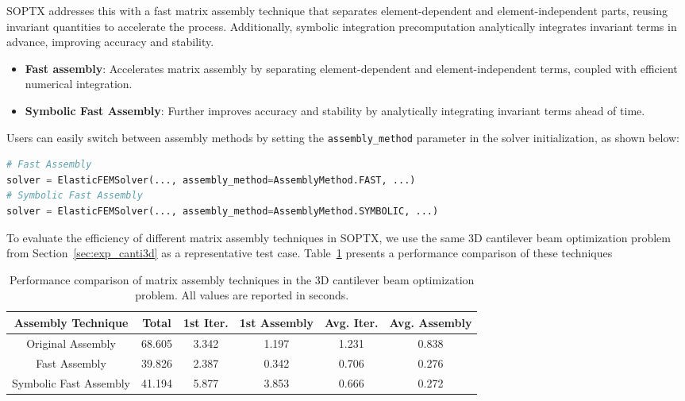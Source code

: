 \documentclass[mathpazo]{cicp}
\begin{document}
SOPTX addresses this with a fast matrix assembly technique that separates element-dependent and element-independent parts, reusing invariant quantities to accelerate the process. Additionally, symbolic integration precomputation analytically integrates invariant terms in advance, improving accuracy and stability.
\begin{itemize} 
	\item \textbf{Fast assembly}: Accelerates matrix assembly by separating element-dependent and element-independent terms, coupled with efficient numerical integration.
	\item \textbf{Symbolic Fast Assembly}: Further improves accuracy and stability by analytically integrating invariant terms ahead of time.
\end{itemize}

Users can easily switch between assembly methods by setting the \texttt{assembly\_method} parameter in the solver initialization, as shown below:
\begin{lstlisting}[language=python]
# Fast Assembly
solver = ElasticFEMSolver(..., assembly_method=AssemblyMethod.FAST, ...)
# Symbolic Fast Assembly
solver = ElasticFEMSolver(..., assembly_method=AssemblyMethod.SYMBOLIC, ...)
\end{lstlisting}

To evaluate the efficiency of different matrix assembly techniques in SOPTX, we use the same 3D cantilever beam optimization problem from Section~\ref{sec:exp_canti3d} as a representative test case. Table~\ref{tab:assembly_comparison} presents a performance comparison of these techniques
\begin{table}[htbp]
	\centering
	\caption{Performance comparison of matrix assembly techniques in the 3D cantilever beam optimization problem. All values are reported in seconds.}
	\begin{tabular}{cccccc}
		\toprule
		\textbf{Assembly Technique} & \textbf{Total} & \textbf{1st Iter.} & \textbf{1st Assembly} & \textbf{Avg. Iter.} & \textbf{Avg. Assembly} \\
		\midrule
		Original Assembly & 68.605 & 3.342 & 1.197 & 1.231 & 0.838 \\
		Fast Assembly & 39.826 & 2.387 & 0.342 & 0.706 & 0.276 \\
		Symbolic Fast Assembly & 41.194 & 5.877 & 3.853 & 0.666 & 0.272 \\
		\bottomrule
	\end{tabular}
	\label{tab:assembly_comparison}
\end{table}
\end{document}
